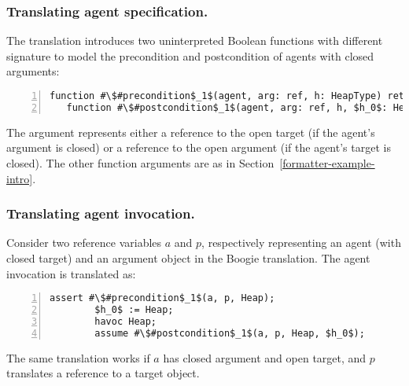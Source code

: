 \subsubsection{Translating agent specification.} 
The translation introduces two uninterpreted Boolean functions with different signature to model
the precondition and postcondition of agents with closed arguments:
\begin{lstlisting}[escapechar=\#,numbers=left,language=Boogie]
   function #\$#precondition$_1$(agent, arg: ref, h: HeapType) returns(bool);
   function #\$#postcondition$_1$(agent, arg: ref, h, $h_0$: HeapType) returns(bool);
\end{lstlisting} 
The argument  represents either a reference to the open target (if the agent's argument is closed) or a reference to the open argument (if the agent's target is closed).
The other function arguments are as in Section~\ref{formatter-example-intro}.


\subsubsection{Translating agent invocation.}
Consider two reference variables $a$ and $p$, respectively representing an agent (with closed target) and an argument object in the Boogie translation.
The agent invocation  is translated as:
\begin{lstlisting}[escapechar=\#,numbers=left,language=Boogie]
        assert #\$#precondition$_1$(a, p, Heap);
        $h_0$ := Heap;
        havoc Heap;
        assume #\$#postcondition$_1$(a, p, Heap, $h_0$);
\end{lstlisting} 
The same translation works if $a$ has closed argument and open target, and $p$ translates a reference to a target object.



